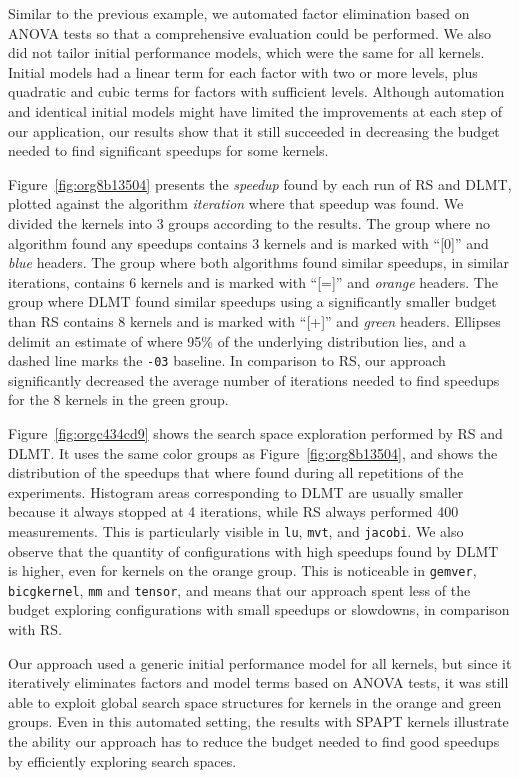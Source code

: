 \documentclass[conference]{IEEEtran}
\begin{document}
Similar to the previous example, we automated factor elimination based on ANOVA
tests so that a comprehensive evaluation could be performed. We also did not
tailor initial performance models, which were the same for all kernels.
Initial models had a linear term for each factor with two or more levels, plus
quadratic and cubic terms for factors with sufficient levels. Although
automation and identical initial models might have limited the improvements at
each step of our application, our results show that it still succeeded in
decreasing the budget needed to find significant speedups for some kernels.

Figure~\ref{fig:org8b13504} presents the \emph{speedup} found by each
run of RS and DLMT, plotted against the algorithm \emph{iteration} where that speedup
was found. We divided the kernels into 3 groups according to the results. The
group where no algorithm found any speedups contains 3 kernels and is marked
with ``[0]'' and \emph{blue} headers. The group where both algorithms found similar
speedups, in similar iterations, contains 6 kernels and is marked with ``[=]''
and \emph{orange} headers. The group where DLMT found similar speedups using a
significantly smaller budget than RS contains 8 kernels and is marked with
``[+]'' and \emph{green} headers. Ellipses delimit an estimate of where 95\% of the
underlying distribution lies, and a dashed line marks the \texttt{-03} baseline.
In comparison to RS, our approach significantly decreased the average number of
iterations needed to find speedups for the 8 kernels in the green group.

Figure~\ref{fig:orgc434cd9} shows the search space exploration performed
by RS and DLMT. It uses the same color groups as
Figure~\ref{fig:org8b13504}, and shows the distribution of the
speedups that where found during all repetitions of the experiments. Histogram
areas corresponding to DLMT are usually smaller because it always stopped at 4
iterations, while RS always performed 400 measurements. This is particularly
visible in \texttt{lu}, \texttt{mvt}, and \texttt{jacobi}. We also observe that the quantity of
configurations with high speedups found by DLMT is higher, even for kernels on
the orange group. This is noticeable in \texttt{gemver}, \texttt{bicgkernel}, \texttt{mm} and
\texttt{tensor}, and means that our approach spent less of the budget exploring
configurations with small speedups or slowdowns, in comparison with RS.

Our approach used a generic initial performance model for all kernels, but
since it iteratively eliminates factors and model terms based on ANOVA tests,
it was still able to exploit global search space structures for kernels in the orange
and green groups. Even in this automated setting, the results with SPAPT kernels
illustrate the ability our approach has to reduce the budget needed to find good
speedups by efficiently exploring search spaces.
\end{document}
